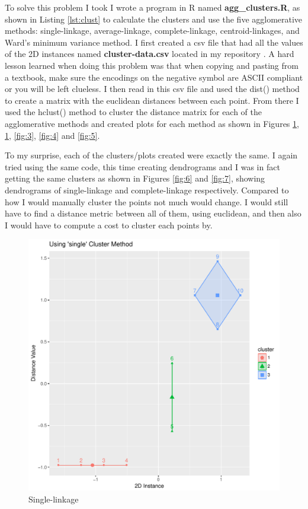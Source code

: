 \documentclass[letterpaper,11pt]{article}
\newcommand*{\srcPath}{../src}%
\begin{document}
To solve this problem I took I wrote a program in R named \textbf{agg\_clusters.R}, as shown in Listing \ref{lst:clust} to calculate the clusters and use the five agglomerative methods: single-linkage, average-linkage, complete-linkage, centroid-linkages, and Ward's minimum variance method.
I first created a csv file that had all the values of the 2D instances named \textbf{cluster-data.csv} located in my repository \cite{github}.
A hard lesson learned when doing this problem was that when copying and pasting from a textbook, make sure the encodings on the negative symbol are ASCII compliant or you will be left clueless.
I then read in this csv file and used the dist() method to create a matrix with the euclidean distances between each point.
From there I used the hclust() method to cluster the distance matrix for each of the agglomerative methods and created plots for each method as shown in Figures \ref{fig:1}, \ref{fig:1}, \ref{fig:3}, \ref{fig:4} and \ref{fig:5}.

To my surprise, each of the clusters/plots created were exactly the same.
I again tried using the same code, this time creating dendrograms and I was in fact getting the same clusters as shown in Figures \ref{fig:6} and \ref{fig:7}, showing dendrograms of single-linkage and complete-linkage respectively.
Compared to how I would manually cluster the points not much would change.
I would still have to find a distance metric between all of them, using euclidean, and then also I would have to compute a cost to cluster each points by.

 

\begin{figure}[h]
\centering
\includegraphics[scale=0.5]{single.pdf}
\caption{Single-linkage}
\label{fig:1}
\end{figure}
\end{document}
